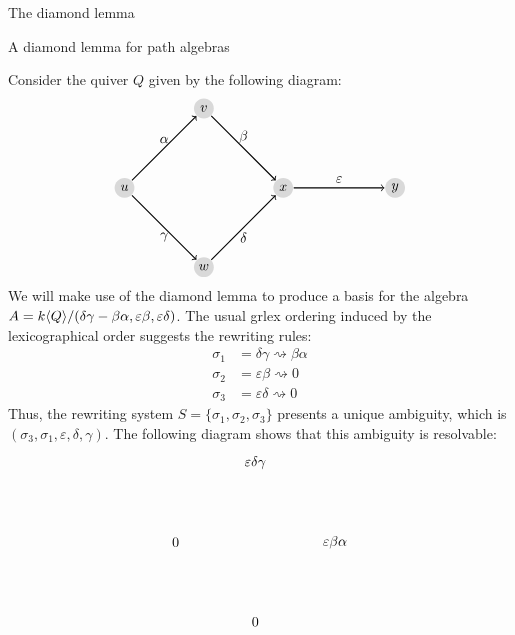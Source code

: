 \begin{chapter}{The diamond lemma}
\begin{section}{A diamond lemma for path algebras}
\begin{exmp} Consider the quiver $Q$ given by the following diagram:
\[
\begin{tikzpicture}[->,node distance=1cm, thick]
\tikzstyle{every node} = [circle, fill=gray!30, minimum size=.5cm, inner sep=.07cm]
\node (1) at (0,0) {$u$};
\node (2) at (2,2) {$v$};
\node (3) at (2,-2) {$w$};
\node (4) at (4,0) {$x$};
\node (5) at (6.82,0) {$y$};
\tikzstyle{every node} = []
\draw (1) -- (2) node[midway, above] {$\alpha$};
\draw (2) -- (4) node[midway, above] {$\beta$};
\draw (1) -- (3) node[midway, below] {$\gamma$};
\draw (3) -- (4) node[midway, below] {$\delta$};
\draw (4) -- (5) node[midway, above] {$\varepsilon$};
\end{tikzpicture}
\]
We will make use of the diamond lemma to produce a basis for the algebra $A=k\langle Q\rangle/(\delta\gamma-\beta\alpha, \varepsilon\beta, \varepsilon\delta)$. The usual grlex ordering induced by the lexicographical order suggests the rewriting rules:
\begin{align*}
\sigma_1 &= \delta\gamma \rightsquigarrow \beta\alpha\\
\sigma_2 &= \varepsilon\beta \rightsquigarrow 0\\
\sigma_3 &= \varepsilon\delta \rightsquigarrow 0
\end{align*}
Thus, the rewriting system $S=\{\sigma_1,\sigma_2,\sigma_3\}$ presents a unique ambiguity, which is $(\sigma_3,\sigma_1, \varepsilon,\delta,\gamma)$. The following diagram shows that this ambiguity is resolvable:
\[
\begin{tikzpicture}
\node (1) at (0,0) {$\varepsilon\delta\gamma$};
\node (a1) at (-2,-2) {$0$};
\node (a2) at (2,-2) {$\varepsilon\beta\alpha$};
\node (b) at (0,-4) {$0$};


\end{tikzpicture}\]
\end{exmp}
\end{section}
\end{chapter}

